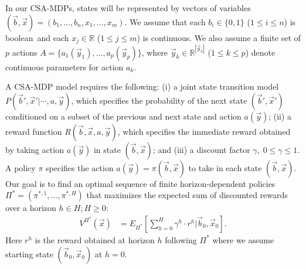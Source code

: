 \label{sec:csamdp}



In our CSA-MDPs, states will be represented by vectors of variables
$(\vec{b},\vec{x}) = ( b_1,\ldots,b_n,x_{1},\ldots,x_m )$.  We assume
that each $b_i \in \{ 0,1 \}$ ($1 \leq i \leq n$) is boolean$\,$
and each $x_j \in \mathbb{R}$ ($1 \leq j \leq
m$) is continuous.  We also assume a finite set of $p$ actions $A = \{
a_1(\vec{y}_1), \ldots, a_p(\vec{y}_p) \}$, where 
$\vec{y}_k \in \mathbb{R}^{|\vec{y}_k|}$ ($1
\leq k \leq p$) denote continuous parameters for 
action $a_k$.

A CSA-MDP model requires the following: (i) a joint state transition model
$P(\vec{b}',\vec{x}'|\cdots,a,\vec{y})$, which specifies the
probability of the next state $(\vec{b}',\vec{x}')$ conditioned on a
subset of the previous and next state and action $a(\vec{y})$; (ii) a
reward function $R(\vec{b},\vec{x},a,\vec{y})$, which specifies the
immediate reward obtained by taking action $a(\vec{y})$ in state
$(\vec{b},\vec{x})$; and (iii) a discount factor $\gamma, \; 0 \leq
\gamma \leq 1$.
A policy $\pi$ specifies the action $a(\vec{y}) =
\pi(\vec{b},\vec{x})$ to take in each state $(\vec{b},\vec{x})$.  Our
goal is to find an optimal sequence of finite horizon-dependent
policies
$\Pi^* = (\pi^{*,1},\ldots,\pi^{*,H})$ that
maximizes the expected sum of discounted rewards over a horizon $h \in
H; H \geq 0$:
\begin{align}
V^{\Pi^*}(\vec{x}) & = E_{\Pi^*} \left[ \sum_{h=0}^{H} \gamma^h \cdot r^h \Big| \vec{b}_0,\vec{x}_0 \right]. \label{eq:vfun_def}
\end{align}
Here $r^h$ is the reward obtained at horizon $h$ following $\Pi^*$ where 
we assume starting state $(\vec{b}_0,\vec{x}_0)$ at $h=0$.
 
